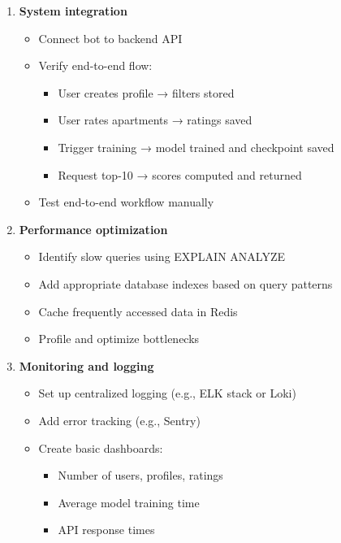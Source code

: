 \documentclass[12pt,a4paper]{article}
\begin{document}
\begin{enumerate}
    \item \textbf{System integration}
    \begin{itemize}
        \item Connect bot to backend API
        \item Verify end-to-end flow:
        \begin{itemize}
            \item User creates profile → filters stored
            \item User rates apartments → ratings saved
            \item Trigger training → model trained and checkpoint saved
            \item Request top-10 → scores computed and returned
        \end{itemize}
        \item Test end-to-end workflow manually
    \end{itemize}
    
    \item \textbf{Performance optimization}
    \begin{itemize}
        \item Identify slow queries using EXPLAIN ANALYZE
        \item Add appropriate database indexes based on query patterns
        \item Cache frequently accessed data in Redis
        \item Profile and optimize bottlenecks
    \end{itemize}
    
    \item \textbf{Monitoring and logging}
    \begin{itemize}
        \item Set up centralized logging (e.g., ELK stack or Loki)
        \item Add error tracking (e.g., Sentry)
        \item Create basic dashboards:
        \begin{itemize}
            \item Number of users, profiles, ratings
            \item Average model training time
            \item API response times
        \end{itemize}
    \end{itemize}
    

\end{enumerate}
\end{document}
